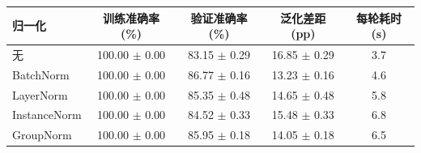 \begin{tabular}{lcccc}
\toprule
归一化 & 训练准确率 (\%) & 验证准确率 (\%) & 泛化差距 (pp) & 每轮耗时 (s) \\
\midrule
无 & 100.00 $\pm$ 0.00 & 83.15 $\pm$ 0.29 & 16.85 $\pm$ 0.29 & 3.7 \\
BatchNorm & 100.00 $\pm$ 0.00 & 86.77 $\pm$ 0.16 & 13.23 $\pm$ 0.16 & 4.6 \\
LayerNorm & 100.00 $\pm$ 0.00 & 85.35 $\pm$ 0.48 & 14.65 $\pm$ 0.48 & 5.8 \\
InstanceNorm & 100.00 $\pm$ 0.00 & 84.52 $\pm$ 0.33 & 15.48 $\pm$ 0.33 & 6.8 \\
GroupNorm & 100.00 $\pm$ 0.00 & 85.95 $\pm$ 0.18 & 14.05 $\pm$ 0.18 & 6.5 \\
\bottomrule
\end{tabular}
